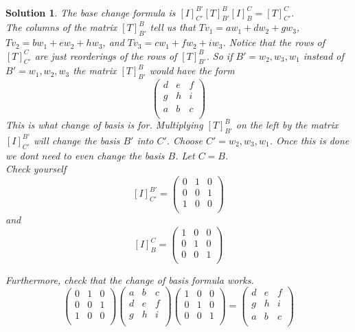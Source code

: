 \documentclass{article}
\theoremstyle{problemstyle}
\theoremstyle{problemstyle}
\newtheorem{solution}{Solution}
\theoremstyle{problemstyle}
\begin{document}
\begin{solution}
The base change formula is $[I]^{B'}_{C'}[T]^{B}_{B'}[I]^{C}_{B} = [T]^{C}_{C'}$.\\

The columns of the matrix $[T]^{B}_{B'}$ tell us that $Tv_1 = aw_1+dw_2+gw_3$, $Tv_2 = bw_1+ew_2+hw_3$, and $Tv_3 = cw_1+fw_2+iw_3$.  Notice that the rows of $[T]^{C}_{C'}$ are just reorderings of the rows of $[T]^{B}_{B'}$. So if $B' = w_2,w_3,w_1$ instead of  $B' = w_1,w_2,w_3$ the matrix $[T]^{B}_{B'}$ would have the form $$\begin{pmatrix} 
 d & e & f   \\
 g & h & i   \\
 a & b & c  \\
\end{pmatrix}$$
This is what change of basis is for. Multiplying $[T]^{B}_{B'}$ on the left by the matrix $[I]^{B'}_{C'}$ will change the basis $B'$ into $C'$. Choose $C' = w_2,w_3,w_1$. Once this is done we dont need to even change the basis $B$. Let $C = B$.\\

Check yourself $$[I]^{B'}_{C'} = 
\begin{pmatrix} 
 0 & 1 & 0   \\
 0 & 0 & 1   \\
 1 & 0 & 0  \\
\end{pmatrix}$$ and 
$$[I]^{C}_{B} = 
\begin{pmatrix} 
 1 & 0 & 0   \\
 0 & 1 & 0   \\
 0 & 0 & 1  \\
\end{pmatrix}$$

Furthermore, check that the change of basis formula works. 
$$\begin{pmatrix} 
 0 & 1 & 0   \\
 0 & 0 & 1   \\
 1 & 0 & 0  \\
\end{pmatrix}
\begin{pmatrix}
a & b & c  \\
 d & e& f   \\
  g & h& i   \\
\end{pmatrix}
\begin{pmatrix} 
 1 & 0 & 0   \\
 0 & 1 & 0   \\
 0 & 0 & 1  \\
\end{pmatrix}
 = 
 \begin{pmatrix} 
 d & e & f   \\
 g & h & i   \\
 a & b & c  \\
\end{pmatrix} $$
\end{solution}
\end{document}
